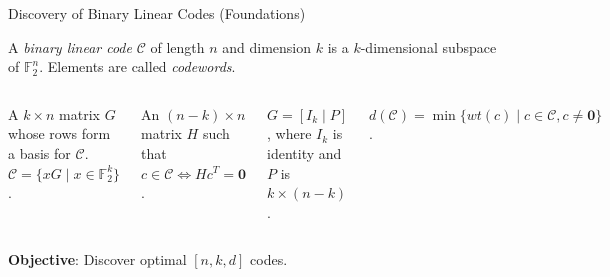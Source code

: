 \documentclass[10pt, aspectratio=169]{beamer}
\begin{document}
\begin{frame}{Discovery of Binary Linear Codes (Foundations)}
    \begin{definition}
    A \textit{binary linear code} $\mathcal{C}$ of length $n$ and dimension $k$ is a $k$-dimensional subspace of $\mathbb{F}_2^n$. Elements are called \textit{codewords}.
    \end{definition}

    \begin{columns}
        \begin{definition}
        A $k \times n$ matrix $G$ whose rows form a basis for $\mathcal{C}$. $\mathcal{C} = \{ xG \mid x \in \mathbb{F}_2^k \}$.
        \end{definition}
        
        \begin{definition}
        An $(n-k) \times n$ matrix $H$ such that $c \in \mathcal{C} \iff Hc^T = \mathbf{0}$.
        \end{definition}

        \begin{definition}
        $G = [I_k \mid P]$, where $I_k$ is identity and $P$ is $k \times (n-k)$.
        \end{definition}
        
       \begin{definition}
        $d(\mathcal{C}) = \min \{ wt(c) \mid c \in \mathcal{C}, c \neq \mathbf{0} \}$.
        \end{definition}
    \end{columns}
    
    \vspace{0.5cm}
    \textbf{Objective}: Discover optimal $[n,k,d]$ codes.
\end{frame}
\end{document}
